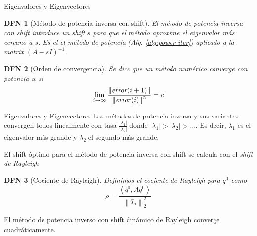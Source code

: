 \documentclass[a4paper]{article}
\newtheorem{definition}{DFN}
\theoremstyle{mytheoremstyle}
\providecommand{\norm}[1]{\left\|#1\right\|}
\providecommand{\dotp}[1]{\left\langle#1\right\rangle}
\begin{document}
\begin{multicols*}{3}
\begin{roundbox}{Eigenvalores y Eigenvectores}
    \begin{definition}[Método de potencia inversa con shift]
        El método de potencia inversa con shift introduce un shift $s$ para que el método aproxime el eigenvalor más cercano a $s$.
        Es el el método de potencia (Alg. \ref{alg:power-iter}) aplicado a la matrix $(A- sI)^{-1}$.
    \end{definition}

    \begin{definition}[Orden de convergencia]
        Se dice que un método numérico converge con potencia $\alpha$ si
        \[
            \lim_{i\to\infty} \frac{\norm{\text{\emph{error}}(i+1)}}{\norm{\text{\emph{error}}(i)}^{\alpha}} = c
        \]
    \end{definition}
\end{roundbox}

\begin{roundbox}{Eigenvalores y Eigenvectores}
    Los métodos de potencia inversa y sus variantes convergen todos linealmente con tasa $\frac{|\lambda_1|}{|\lambda_2|}$ donde $|\lambda_1| > |\lambda_2| > \dots$.
    Es decir, $\lambda_1$ es el eigenvalor más grande y $\lambda_2$ el segundo más grande.

    El shift óptimo para el método de potencia inversa con shift se calcula con el \emph{shift de Rayleigh}

    \begin{definition}[Cociente de Rayleigh]
        Definimos el cociente de Rayleigh para $q^0$ como
        \[
            \rho = \frac{\dotp{q^0, Aq^0}}{\norm{q_o}_{2}^{2}}
        \]
    \end{definition}

    El método de potencia inverso con shift dinámico de Rayleigh converge cuadráticamente.
\end{roundbox}

\end{multicols*}
\end{document}
